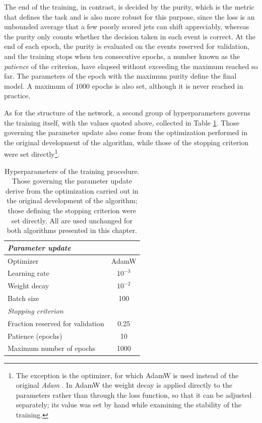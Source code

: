 The end of the training, in contrast, is decided by the purity, which is the metric that defines the task and is also more robust for this purpose, since the loss is an unbounded average that a few poorly scored jets can shift appreciably, whereas the purity only counts whether the decision taken in each event is correct. At the end of each epoch, the purity is evaluated on the events reserved for validation, and the training stops when ten consecutive epochs, a number known as the \textit{patience} of the criterion, have elapsed without exceeding the maximum reached so far. The parameters of the epoch with the maximum purity define the final model. A maximum of $1000$ epochs is also set, although it is never reached in practice.\medskip


As for the structure of the network, a second group of hyperparameters governs the training itself, with the values quoted above, collected in Table \ref{tab:hyperparams_training}. Those governing the parameter update also come from the optimization performed in the original development of the algorithm, while those of the stopping criterion were set directly\footnote{The exception is the optimizer, for which AdamW is used instead of the original \textit{Adam} \cite{Kingma2015}. In AdamW the weight decay is applied directly to the parameters rather than through the loss function, so that it can be adjusted separately; its value was set by hand while examining the stability of the training.}.
%
\begin{table}[t]
\centering
\begin{tabular}{lc}
\toprule
\multicolumn{2}{l}{\textit{Parameter update}} \\
\midrule
Optimizer                          & AdamW \\
Learning rate                      & $10^{-3}$ \\
Weight decay                       & $10^{-2}$ \\
Batch size                         & 100 \\
\midrule
\multicolumn{2}{l}{\textit{Stopping criterion}} \\
\midrule
Fraction reserved for validation   & 0.25 \\
Patience (epochs)                  & 10 \\
Maximum number of epochs           & 1000 \\
\bottomrule
\end{tabular}
\caption{Hyperparameters of the training procedure. Those governing the parameter update derive
from the optimization carried out in the original development of the algorithm; those defining the
stopping criterion were set directly. All are used unchanged for both algorithms presented in this
chapter.}
\label{tab:hyperparams_training}
\end{table}
\medskip

